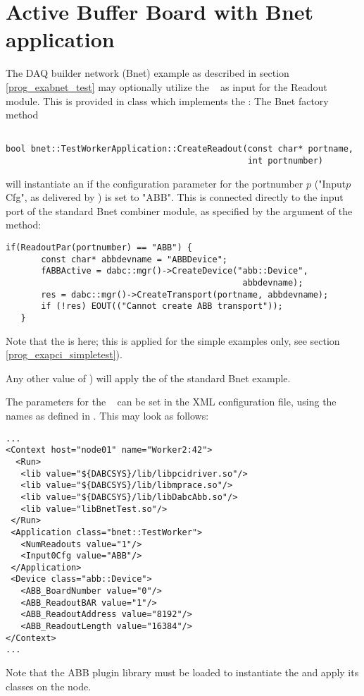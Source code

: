 \section{Active Buffer Board with Bnet application}
\label{prog_exapci_bnet}
The DAQ builder network (Bnet) example as described in section
\ref{prog_exabnet_test} may optionally utilize the \ABB~
as input for the Readout module. This is provided in
class   which implements
the : 
The Bnet factory method 
\begin{verbatim}

bool bnet::TestWorkerApplication::CreateReadout(const char* portname, 
                                                int portnumber)

\end{verbatim}
will instantiate an 
if the configuration parameter for the portnumber $p$ 
("Input$p$Cfg", as delivered by ) is set to "ABB".
This  is connected  
directly to the input port of the standard Bnet combiner module, as specified by
the  argument of the method:

\begin{verbatim}
if(ReadoutPar(portnumber) == "ABB") {
       const char* abbdevname = "ABBDevice";
       fABBActive = dabc::mgr()->CreateDevice("abb::Device", 
                                               abbdevname);
       res = dabc::mgr()->CreateTransport(portname, abbdevname);
       if (!res) EOUT(("Cannot create ABB transport"));
   } 
\end{verbatim}

Note that the  is  here; 
this is applied for the simple examples only, 
see section \ref{prog_exapci_simpletest}). 

Any other value of ) will
apply the  of the standard Bnet example. 

The parameters for the \ABB~
can be set in the XML configuration file, using the names as defined
in . This may look as follows:

\begin{verbatim}
...
<Context host="node01" name="Worker2:42">
  <Run>
   <lib value="${DABCSYS}/lib/libpcidriver.so"/>          
   <lib value="${DABCSYS}/lib/libmprace.so"/>
   <lib value="${DABCSYS}/lib/libDabcAbb.so"/>          
   <lib value="libBnetTest.so"/>
 </Run> 
 <Application class="bnet::TestWorker">
   <NumReadouts value="1"/>
   <Input0Cfg value="ABB"/>
 </Application>        
 <Device class="abb::Device">
   <ABB_BoardNumber value="0"/>
   <ABB_ReadoutBAR value="1"/> 
   <ABB_ReadoutAddress value="8192"/>
   <ABB_ReadoutLength value="16384"/>       
</Context>
...
\end{verbatim}

Note that the ABB plugin library  must be loaded
to instantiate the  and apply its classes on the node.


